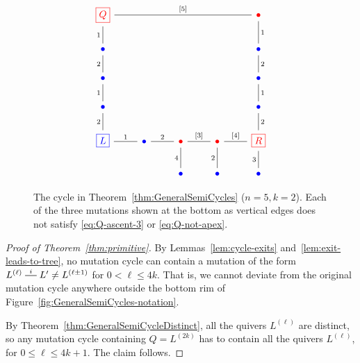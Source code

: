 \documentclass[11pt, letterpaper]{amsart}
\theoremstyle{definition}
\numberwithin{equation}{section}
\newcommand{\red}[1]{{\color{red} #1}}
\newcommand{\blue}[1]{{\color{blue} #1}}
\newcommand{\shortmutation}[1]{\stackrel{#1}{\rule[.5ex]{1.2em}{0.5pt}}}
\begin{document}
\begin{figure}[ht]
\begin{center}
\vspace{-10pt}
\begin{equation*}
\begin{tikzcd}[arrows={-stealth, cramped, sep=small}]
\red{\boxed{Q}}  \arrow[rrrr, no head, "{[5]}"] \arrow[d, swap, no head, "1"]
  &&&& \red{\bullet} \arrow[d, no head, "1"] \\
\blue{\bullet} \arrow[d, swap, no head,"2"] &&&&  \blue{\bullet} \arrow[d, no head,"2"]  \\
\blue{\bullet} \arrow[d, swap, no head,"1"] &&&&  \blue{\bullet} \arrow[d, no head,"1"]  \\
\blue{\bullet} \arrow[d, swap, no head,"2"] &&&&  \blue{\bullet} \arrow[d, no head,"2"]  \\
\blue{\boxed{L}} \arrow[r, no head, "1"] & \blue{\bullet} \arrow[r, no head, "2" ] 
    & \red{\bullet} \arrow[r, no head,"{[3]}"] & \red{\bullet} \arrow[r, no head,"{[4]}"] & \red{\boxed{R}}\\
& & \blue{\bullet} \ar[u, no head, "4"] & \blue{\bullet} \ar[u, no head, "2"] & \blue{\bullet} \ar[u, no head, "3"]
\end{tikzcd}
\end{equation*}
\vspace{-10pt}
\end{center}
\caption{
The cycle in Theorem~\ref{thm:GeneralSemiCycles} (${n=5, k=2}$). 
Each of the three mutations shown at the bottom as vertical edges does not satisfy \eqref{eq:Q-ascent-3} 
or \eqref{eq:Q-not-apex}. 
}
\label{fig:mutations-which-may-not-be-exits}
\end{figure}

\vspace{-20pt}

\begin{proof}[Proof of Theorem~\ref{thm:primitive}]
By Lemmas~\ref{lem:cycle-exits} and~\ref{lem:exit-leads-to-tree}, 
no mutation cycle can contain a mutation of the form 
$L^{(\ell)}\shortmutation{i} L'\neq L^{(\ell\pm1)}$ for $0<\ell\le 4k$. 
That is, we cannot deviate from the original mutation cycle anywhere outside the bottom rim of Figure~\ref{fig:GeneralSemiCycles-notation}. 

By Theorem~\ref{thm:GeneralSemiCycleDistinct}, all the quivers $L^{(\ell)}$ are distinct, 
so any mutation cycle containing $Q=L^{(2k)}$ has to contain all the quivers $L^{(\ell)}$, for $0\le \ell\le 4k+1$. 
The claim follows. 
\end{proof}
\end{document}
